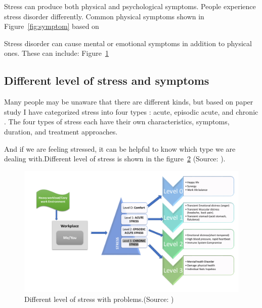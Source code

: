 Stress can produce both physical and psychological symptoms. People experience stress disorder differently. Common physical symptoms shown in Figure~\ref{fig:symptom} based on \citep{Legg2017StressManagement}

Stress disorder can cause mental or emotional symptoms in addition to physical ones. These can include: Figure~\ref{fig:mentalsymptom} 
\begin{figure}[ht!]
\centering
{}
  \label{fig:mentalsymptom}
\end{figure}

\subsection{Different level of stress and symptoms}
Many people may be unaware that there are different kinds, but based on \citep{Freshwater20183Hazards} paper study I have categorized stress into four types : acute, episodic acute, and chronic . The four types of stress each have their own characteristics, symptoms, duration, and treatment approaches.

And if we are feeling stressed, it can be helpful to know which type we are dealing with.Different level of stress is shown in the figure~\ref{fig:levelOfStress} (Source: \cite{Freshwater20183Hazards}).\\
\begin{figure}[ht!] %
  \centering
  \includegraphics[width=1.10\linewidth]{chap1/images/problem_goal.pdf}
  \caption[Different level of stress ]{Different level of stress with problems.(Source: \cite{Freshwater20183Hazards})}
  \label{fig:levelOfStress}
\end{figure}

